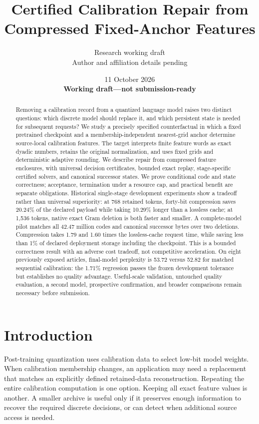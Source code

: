\documentclass[10pt,twocolumn,letterpaper]{article}
\title{Certified Calibration Repair from Compressed Fixed-Anchor Features}
\author{Research working draft\\Author and affiliation details pending}
\date{11 October 2026\\\textbf{Working draft---not submission-ready}}
\begin{document}
\maketitle

\begin{abstract}
Removing a calibration record from a quantized language model raises two distinct
questions: which discrete model should replace it, and which persistent state is
needed for subsequent requests? We study a precisely specified counterfactual in
which a fixed pretrained checkpoint and a membership-independent nearest-grid
anchor determine source-local calibration features. The target interprets finite
feature words as exact dyadic numbers, retains the original normalization, and
uses fixed grids and deterministic adaptive rounding. We describe repair from
compressed feature enclosures, with universal decision certificates, bounded
exact replay, stage-specific certified solvers, and canonical successor states.
We prove conditional code and state correctness; acceptance, termination under a
resource cap, and practical benefit are separate obligations. Historical
single-stage development experiments show a tradeoff rather than universal
superiority: at 768 retained tokens, forty-bit compression saves 20.24\% of the
declared payload while taking 10.29\% longer than a lossless cache; at 1,536 tokens,
native exact Gram deletion is both faster and smaller. A complete-model pilot
matches all 42.47 million codes and canonical successor bytes over two deletions.
Compression takes 1.79 and 1.60 times the lossless-cache request time, while saving
less than 1\% of declared deployment storage including the checkpoint. This is a
bounded correctness result with an adverse cost tradeoff, not competitive
acceleration. On eight previously exposed articles, final-model perplexity is
53.72 versus 52.82 for matched sequential calibration: the 1.71\% regression
passes the frozen development tolerance but establishes no quality advantage.
Useful-scale validation, untouched quality evaluation, a second model,
prospective confirmation, and broader comparisons remain necessary before
submission.
\end{abstract}

\section{Introduction}
Post-training quantization uses calibration data to select low-bit model weights.
When calibration membership changes, an application may need a replacement that
matches an explicitly defined retained-data reconstruction. Repeating the entire
calibration computation is one option. Keeping all exact feature values is
another. A smaller archive is useful only if it preserves enough information to
recover the required discrete decisions, or can detect when additional source
access is needed.
\end{document}
